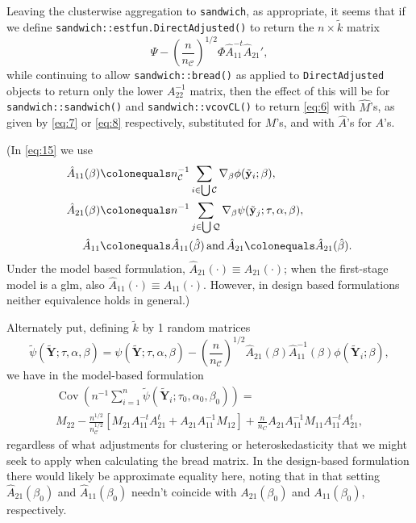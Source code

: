 \documentclass{article}
\newcommand{\defeq}{\ensuremath{\colonequals}}
\begin{document}
Leaving the clusterwise aggregation to \texttt{sandwich}, as
appropriate, it seems that if we define
\texttt{sandwich::estfun.DirectAdjusted()} to return the $n \times \tilde{k}$ matrix
\begin{equation} \label{eq:15}
  \Psi -
  \left(\frac{n}{n_{\mathcal{C}}}\right)^{1/2}\Phi
  \hat{A}_{11}^{-t}\hat{A}_{21}', 
\end{equation}
while continuing to allow \texttt{sandwich::bread()} as applied to
\texttt{DirectAdjusted} objects to return only
the lower $A_{22}^{-1}$ matrix, then the effect of this will be for \texttt{sandwich::sandwich()}
and \texttt{sandwich::vcovCL()} to return \eqref{eq:6} with
$\hat{M}$'s,  as
given by \eqref{eq:7} or \eqref{eq:8} respectively, substituted for
$M$'s, and with $\hat{A}$'s for $A$'s.

(In \eqref{eq:15}
we use
\begin{align*}
  \hat{A}_{11}(\beta) &\defeq  n_{\mathcal{C}}^{-1}\sum_{i\in \bigcup
        \mathcal{C}}\nabla_{\beta}\phi(\tilde{\mathbf{y}}_{i};
        \beta ),\\
  \hat{A}_{21}(\beta) &\defeq n^{-1}\sum_{j\in \bigcup
        \mathcal{Q}}\nabla_{\beta}\psi(\tilde{\mathbf{y}}_{j};
        \tau, \alpha, \beta ),\\
  \hat{A}_{11}&\defeq \hat{A}_{11}(\hat\beta)\, \text{and}\, \hat{A}_{21}\defeq \hat{A}_{21}(\hat\beta).
\end{align*}
Under the model based
formulation, $\hat{A}_{21}(\cdot) \equiv {A}_{21}(\cdot)$; when the
first-stage model is a glm, also $\hat{A}_{11}(\cdot) \equiv
{A}_{11}(\cdot)$.  However, in design based formulations neither
equivalence holds in general.)

Alternately put,
defining $\tilde{k}$ by 1 random matrices 
\begin{equation}\label{eq:10}
    \tilde{\psi}(\tilde{\mathbf{Y}}; \tau, \alpha, 
    \beta) = \psi (\tilde{\mathbf{Y}}; \tau,\alpha, 
    \beta) -
    \left(\frac{n}{n_{\mathcal{C}}}\right)^{1/2}
    \hat{A}_{21}(\beta) \hat{A}_{11}^{-1}(\beta)\phi(\tilde{\mathbf{Y}}_{i};
    \beta), 
\end{equation}
we have in the model-based formulation 
\begin{multline*}
  \operatorname{Cov}\left(n^{-1}\sum_{i=1}^{n} \tilde{\psi}(\tilde{\mathbf{Y}}_{i}; \tau_{0},\alpha_{0},
    \beta_{0})\right) = \\
  M_{22} -
                                 \frac{n^{1/2}}{n_{\mathcal{C}}^{1/2}}[M_{21}A_{11}^{-t}A_{21}^t
                                 + A_{21}A_{11}^{-1}M_{12}] +
                                 \frac{n}{n_C}A_{21}A_{11}^{-1}M_{11}A_{11}^{-t}A_{21}^{t},
                               \end{multline*}
regardless of what adjustments for
clustering or heteroskedasticity that we might seek to apply when
calculating the bread matrix.   In the design-based formulation there
would likely be approximate equality here, noting that in that setting
$\hat{A}_{21}(\beta_{0})$ and $\hat{A}_{11}(\beta_{0})$ needn't
coincide with ${A}_{21}(\beta_{0})$ and ${A}_{11}(\beta_{0})$, respectively.
\end{document}
